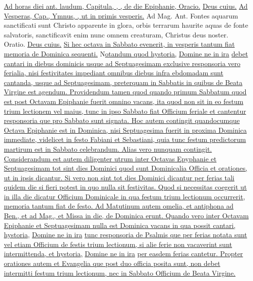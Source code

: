 \begin{multicols*}{2}
\newline \ul{Ad horas diei ant. laudum, Capitula, \Rbar , \Vbar , de die Epiphanie, Oracio.} \hyperlink{deus-cuius-unigenitus-epiphanie}{Deus cuius.} \ul{Ad Vesperas, Cap., Ymnus, \Vbar , ut in primis vesperis.} {\color{Red} Ad Mag. Ant.} Fontes aquarum sanctificati sunt Christo apparente in glora, orbis terrarum haurite aquas de fonte salvatoris, sanctificavit enim nunc omnem creaturam, Christus deus noster. {\color{Red} Oratio.} \hyperlink{deus-cuius-unigenitus-epiphanie}{Deus cuius.} \ul{Si hec octava in Sabbato evenerit, in vesperis tantum fiat memoria de Dominica sequenti.}
\lettrine[lines=2]{\zallmancaps \color{Red} N}{}\ul{otandum quod hystoria,} \hyperlink{domine-ne-in-ira}{Domine ne in ira} \ul{debet cantari in diebus dominicis usque ad Septuagesimam exclusive responsoria vero ferialia, nisi festivitates impediant omnibus diebus infra ebdomadam sunt cantanda, usque ad Septuagesimam, preterquam in Sabbatis in quibus de Beata Virgine est agendum.
Providendum tamen quod quando primum Sabbatum quod est post Octavam Epiphanie fuerit omnino vacans, ita quod non sit in eo festum trium lectionem vel maius, tunc in ipso Sabbato fiat Officium feriale et cantentur responsoria que pro Sabbato sunt signata.
Hoc autem contingit quandocumque Octava Epiphanie est in Dominica, nisi Septuagesima fuerit in proxima Dominica immediate, videlicet in festo Fabiani et Sebastiani, quia tunc festum predictorum martirum est in Sabbato celebrandum. Alias vero nunquam contingit.}
\newline \ul{Considerandum est autem diligenter utrum inter Octavas Epyphanie et Septuagesimam tot sint dies Dominici quod sunt Dominicalia Officia et orationes, ut in ipsis dicantur. Si vero non sint tot dies Dominici dicantur per ferias tali quidem die si fieri potest in quo nulla sit festivitas. Quod si necessitas coegerit ut in illa die dicatur Officium Dominicale in qua festum trium lectionum occurrerit, memoria tantum fiat de festo.
Ad Matutinum autem omelia, et antiphona ad Ben., et ad Mag., et Missa in die, de Dominica erunt.
Quando vero inter Octavam Epiphanie et Septuagesimam nulla est Dominica vacans in qua possit cantari, hystoria,} \hyperlink{domine-ne-in-ira}{Domine ne in ira} \ul{tunc responsoria de Psalmis que per ferias notata sunt vel etiam Officium de festis trium lectionum, si alie ferie non vacaverint sunt intermittenda, et hystoria,} \hyperlink{domine-ne-in-ira}{Domine ne in ira} \ul{per easdem ferias cantetur.
Propter orationes autem et Evangelia que post duo officia posita sunt, non debet intermitti festum trium lectionum, nec in Sabbato Officium de Beata Virgine.}

\end{multicols*}
